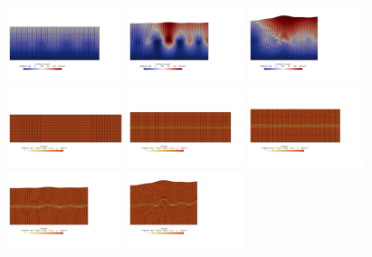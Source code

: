 \begin{center}
\includegraphics[width=3.4cm]{python_codes/fieldstone_129/results/experiment1/vel0199}
\includegraphics[width=3.4cm]{python_codes/fieldstone_129/results/experiment1/vel0299}
\includegraphics[width=3.4cm]{python_codes/fieldstone_129/results/experiment1/vel0399}\\
\includegraphics[width=3.4cm]{python_codes/fieldstone_129/results/experiment1/sigmam0000}
\includegraphics[width=3.4cm]{python_codes/fieldstone_129/results/experiment1/sigmam0099}
\includegraphics[width=3.4cm]{python_codes/fieldstone_129/results/experiment1/sigmam0199}
\includegraphics[width=3.4cm]{python_codes/fieldstone_129/results/experiment1/sigmam0299}
\includegraphics[width=3.4cm]{python_codes/fieldstone_129/results/experiment1/sigmam0399}\\
\end{center}

